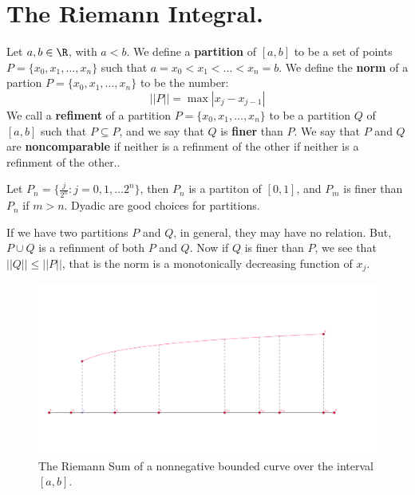 

\section{The Riemann Integral.}

\begin{definition}
    Let $a,b \in \R$, with  $a<b$. We define a  \textbf{partition} of $[a,b]$ to be a set of points $P=\{x_0,x_1, \dots, x_n\}$ such that $a=x_0<x_1< \dots <x_n=b$.
    We define the \textbf{norm} of a partion $P=\{x_0,x_1, \dots, x_n\}$ to be the number:
    \begin{equation}
        ||P||=\max|x_j-x_{j-1}|
    \end{equation} 
    We call a \textbf{refiment} of a partition $P=\{x_0,x_1, \dots, x_n\}$ to be a partition $Q$ of  $[a,b]$ such that  $P \subseteq P$, and we say that $Q$ is  \textbf{finer} than $P$. We say that $P$ and  $Q$ are  \textbf{noncomparable} if neither is a refinment of the other if neither is a refinment of the other..
\end{definition}

\begin{example}
    Let $P_n=\{\frac{j}{2^n}: j=0,1, \dots 2^n\}$, then $P_n$ is a partiton of  $[0,1]$, and  $P_m$ is finer than  $P_n$ if  $m>n$.
    Dyadic are good choices for partitions.
\end{example} 

If we have two partitions $P$ and  $Q$, in general, they may have no relation. But, $P \cup Q$ is a refinment of both  $P$ and  $Q$. Now if  $Q$ is finer than $P$, we see that  $||Q|| \leq ||P||$, that is the norm is a monotonically decreasing function of  $x_j$.

\begin{figure}
    \centering
    \includegraphics[scale = 0.5]{figures/partitionOfACurve.png}
    \caption{The Riemann Sum of a nonnegative bounded curve over the interval $[a,b]$.}
    \label{fig_5.1}
\end{figure}

